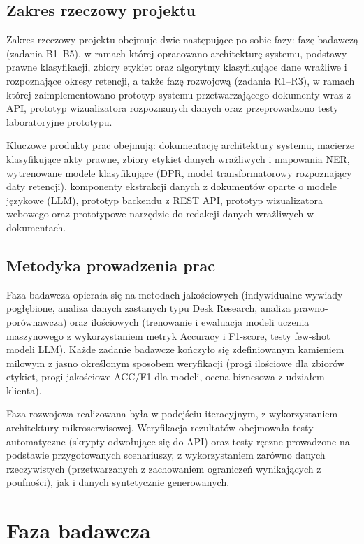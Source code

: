 \documentclass[12pt,a4paper]{report}
\begin{document}
\section{Zakres rzeczowy projektu}
Zakres rzeczowy projektu obejmuje dwie następujące po sobie fazy: fazę badawczą (zadania B1--B5), w ramach której opracowano architekturę systemu, podstawy prawne klasyfikacji, zbiory etykiet oraz algorytmy klasyfikujące dane wrażliwe i rozpoznające okresy retencji, a także fazę rozwojową (zadania R1--R3), w ramach której zaimplementowano prototyp systemu przetwarzającego dokumenty wraz z API, prototyp wizualizatora rozpoznanych danych oraz przeprowadzono testy laboratoryjne prototypu.

Kluczowe produkty prac obejmują: dokumentację architektury systemu, macierze klasyfikujące akty prawne, zbiory etykiet danych wrażliwych i mapowania NER, wytrenowane modele klasyfikujące (DPR, model transformatorowy rozpoznający daty retencji), komponenty ekstrakcji danych z dokumentów oparte o modele językowe (LLM), prototyp backendu z REST API, prototyp wizualizatora webowego oraz prototypowe narzędzie do redakcji danych wrażliwych w dokumentach.

\section{Metodyka prowadzenia prac}
Faza badawcza opierała się na metodach jakościowych (indywidualne wywiady pogłębione, analiza danych zastanych typu Desk Research, analiza prawno-porównawcza) oraz ilościowych (trenowanie i ewaluacja modeli uczenia maszynowego z wykorzystaniem metryk Accuracy i F1-score, testy few-shot modeli LLM). Każde zadanie badawcze kończyło się zdefiniowanym kamieniem milowym z jasno określonym sposobem weryfikacji (progi ilościowe dla zbiorów etykiet, progi jakościowe ACC/F1 dla modeli, ocena biznesowa z udziałem klienta).

Faza rozwojowa realizowana była w podejściu iteracyjnym, z wykorzystaniem architektury mikroserwisowej. Weryfikacja rezultatów obejmowała testy automatyczne (skrypty odwołujące się do API) oraz testy ręczne prowadzone na podstawie przygotowanych scenariuszy, z wykorzystaniem zarówno danych rzeczywistych (przetwarzanych z zachowaniem ograniczeń wynikających z poufności), jak i danych syntetycznie generowanych.




\chapter{Faza badawcza}
\end{document}
